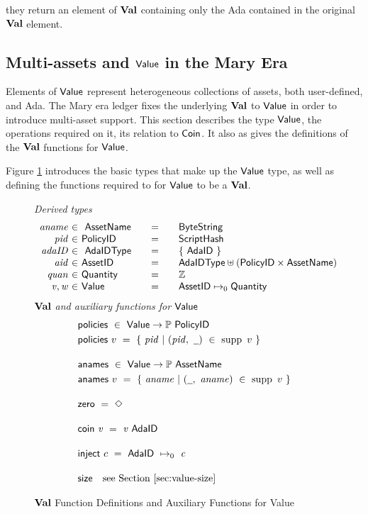 they return an element of $\mathbf{Val}$ containing only the Ada contained in the original $\mathbf{Val}$ element.

\subsection{Multi-assets and $\mathsf{Value}$ in the Mary Era}

Elements of $\mathsf{Value}$ represent heterogeneous collections of assets,
both user-defined, and Ada. The Mary era ledger fixes the underlying $\mathbf{Val}$ to
$\mathsf{Value}$ in order to introduce multi-asset support.
This section describes the type $\mathsf{Value}$, the operations required on
it, its relation to $\mathsf{Coin}$. It also as gives the definitions of the
$\mathbf{Val}$ functions for $\mathsf{Value}$.

Figure \ref{fig:defs:value} introduces the basic types that make up the $\mathsf{Value}$ type,
as well as defining the functions required to for $\mathsf{Value}$ to be a $\mathbf{Val}$.

\begin{figure*}[t!]
  \emph{Derived types}
  \begin{equation*}
    \begin{array}{r@{~\in~}l@{\qquad=\qquad}lr}
      \var{aname} & ~\AssetName & \mathsf{ByteString} \\
      \var{pid} & \PolicyID & \ScriptHash \\
      \var{adaID} & ~\AdaIDType & \{~\mathsf{AdaID}~\} \\
      \var{aid} & \AssetID & \AdaIDType \uniondistinct (\PolicyID \times \AssetName) \\
      \var{quan} & \Quantity & \Z \\
      \var{v}, \var{w} & \Value & \AssetID \mapsto_0 \Quantity
    \end{array}
  \end{equation*}
  \emph{$\mathbf{Val}$ and auxiliary functions for $\mathsf{Value}$}
  \begin{align*}
    & \fun{policies} ~\in~ \Value \to \powerset{\PolicyID} \\
    & \fun{policies}~v ~=~ \{~\var{pid}~\vert~(\var{pid,~\wcard})~\in~\supp{~v}~\}
    \nextdef
    & \fun{anames} ~\in~ \Value \to \powerset{\AssetName} \\
    & \fun{anames}~v ~=~ \{~\var{aname}~\vert~(\var{\wcard,~aname})~\in~\supp{~v}~\}
    \nextdef
    & \fun{zero} ~=~ \Nothing
    \nextdef
    & \fun{coin}~\var{v} ~=~ \var{v}~\mathsf{AdaID}
    \nextdef
    & \fun{inject}~c  ~=~ \mathsf{AdaID}~\mapsto_0~\var{c}
    \nextdef
    & \fun{size} ~~~ \text{see Section \ref{sec:value-size}}
  \end{align*}
  \caption{$\mathbf{Val}$ Function Definitions and Auxiliary Functions for Value}
  \label{fig:defs:value}
\end{figure*}

